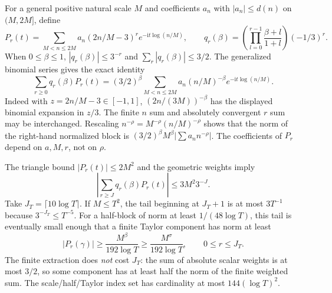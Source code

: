 \documentclass[11pt,a4paper]{article}
\numberwithin{equation}{section}
\theoremstyle{definition}
\newcommand{\ii}{\mathrm i}
\begin{document}
For a general positive natural scale $M$ and coefficients $a_n$ with
$|a_n|\le d(n)$ on $(M,2M]$, define
\[
 P_r(t)=\sum_{M<n\le2M}a_n(2n/M-3)^r e^{-\ii t\log(n/M)},\qquad
 q_r(\beta)=\left(\prod_{l=0}^{r-1}\frac{\beta+l}{1+l}\right)(-1/3)^r.
\]
When $0\le\beta\le1$,
$|q_r(\beta)|\le3^{-r}$ and $\sum_r|q_r(\beta)|\le3/2$.
The generalized binomial series gives the exact identity
\begin{equation*}
 \sum_{r\ge0}q_r(\beta)P_r(t)
 = (3/2)^\beta\sum_{M<n\le2M}a_n(n/M)^{-\beta}
                                      e^{-\ii t\log(n/M)}.
\end{equation*}
Indeed with $z=2n/M-3\in[-1,1]$, $(2n/(3M))^{-\beta}$ has the displayed
binomial expansion in $z/3$. The finite $n$ sum and absolutely convergent
$r$ sum may be interchanged. Rescaling $n^{-\rho}=M^{-\rho}(n/M)^{-\rho}$
shows that the norm of the right-hand normalized block is
$(3/2)^\beta M^\beta|\sum a_nn^{-\rho}|$.
The coefficients of $P_r$ depend on $a,M,r$, not on $\rho$.

The triangle bound $|P_r(t)|\le2M^2$ and the geometric weights imply
\[
 \left|\sum_{r\ge J}q_r(\beta)P_r(t)\right|\le3M^2 3^{-J}.
\]
Take $J_T=\lceil10\log T\rceil$. If $M\le T^2$, the tail beginning at $J_T+1$
is at most $3T^{-1}$ because $3^{-J_T}\le T^{-5}$.
For a half-block of norm at least $1/(48\log T)$, this tail is eventually
small enough that a finite Taylor component has norm at least
\begin{equation*}
 |P_r(\gamma)|\ge\frac{M^\beta}{192\log T}
          \ge\frac{M^\sigma}{192\log T},\qquad0\le r\le J_T.
\end{equation*}
The finite extraction does \emph{not} cost $J_T$: the sum of absolute scalar
weights is at most $3/2$, so some component has at least half the norm of the
finite weighted sum. The scale/half/Taylor index set has cardinality at most
$144(\log T)^2$.
\end{document}
